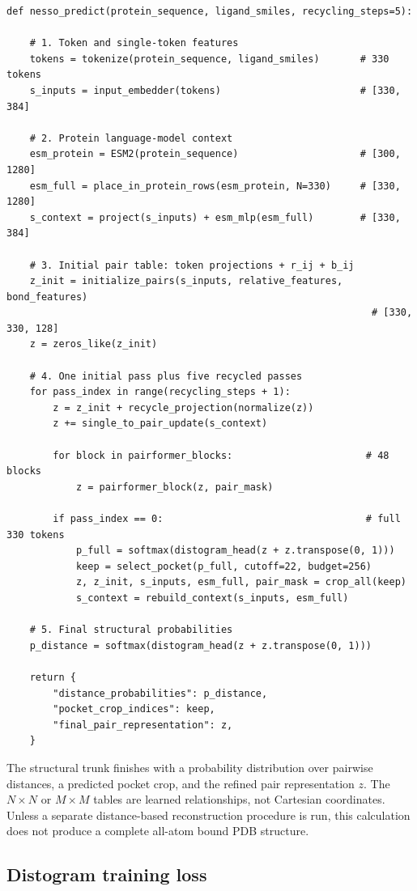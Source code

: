\documentclass[11pt]{article}
\begin{document}
\begin{verbatim}
def nesso_predict(protein_sequence, ligand_smiles, recycling_steps=5):

    # 1. Token and single-token features
    tokens = tokenize(protein_sequence, ligand_smiles)       # 330 tokens
    s_inputs = input_embedder(tokens)                        # [330, 384]

    # 2. Protein language-model context
    esm_protein = ESM2(protein_sequence)                     # [300, 1280]
    esm_full = place_in_protein_rows(esm_protein, N=330)     # [330, 1280]
    s_context = project(s_inputs) + esm_mlp(esm_full)        # [330, 384]

    # 3. Initial pair table: token projections + r_ij + b_ij
    z_init = initialize_pairs(s_inputs, relative_features, bond_features)
                                                               # [330, 330, 128]
    z = zeros_like(z_init)

    # 4. One initial pass plus five recycled passes
    for pass_index in range(recycling_steps + 1):
        z = z_init + recycle_projection(normalize(z))
        z += single_to_pair_update(s_context)

        for block in pairformer_blocks:                       # 48 blocks
            z = pairformer_block(z, pair_mask)

        if pass_index == 0:                                   # full 330 tokens
            p_full = softmax(distogram_head(z + z.transpose(0, 1)))
            keep = select_pocket(p_full, cutoff=22, budget=256)
            z, z_init, s_inputs, esm_full, pair_mask = crop_all(keep)
            s_context = rebuild_context(s_inputs, esm_full)

    # 5. Final structural probabilities
    p_distance = softmax(distogram_head(z + z.transpose(0, 1)))

    return {
        "distance_probabilities": p_distance,
        "pocket_crop_indices": keep,
        "final_pair_representation": z,
    }
\end{verbatim}

The structural trunk finishes with a probability distribution over pairwise
distances, a predicted pocket crop, and the refined pair representation $z$.
The $N\times N$ or $M\times M$ tables are learned relationships, not Cartesian
coordinates. Unless a separate distance-based reconstruction procedure is run,
this calculation does not produce a complete all-atom bound PDB structure.

\subsection{Distogram training loss}
\end{document}
